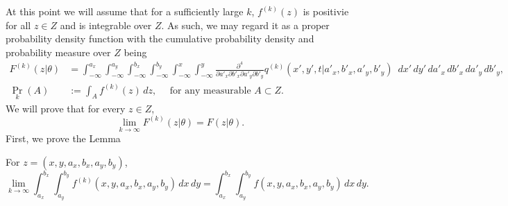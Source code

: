 At this point we will assume that for a sufficiently large $k$,
$f^{(k)}(z)$ is positivie for all $z \in Z$ and is integrable over
$Z$. As such, we may regard it as a proper probability density
function with the cumulative probability density and probability
measure over $Z$ being 
\begin{align}
  F^{(k)}(z | \theta) &= \displaystyle \int_{-\infty}^{a_x} \displaystyle \int_{-\infty}^{a_y} \displaystyle \int_{-\infty}^{b_x} \displaystyle \int_{-\infty}^{b_y} \displaystyle \int_{-\infty}^x \displaystyle \int_{-\infty}^y \frac{\partial^4}{\partial a'_x \partial b'_x \partial a'_y \partial b'_y} q^{(k)}(x', y', t | a'_x, b'_x, a'_y, b'_y)\,\,\, dx'\, dy'\, da'_x\, db'_x\, da'_y\, db'_y, \label{eq:approx-measure} \\
                          \Pr_{k}(A) &:= \displaystyle \int_{A} f^{(k)}(z)\, dz, \quad \mbox{ for any measurable } A \subset Z. \label{eq:approx-measure-2}
\end{align}
We will prove that for every $z \in Z$,
\[
  \lim_{k\to \infty} F^{(k)}(z | \theta) = F(z | \theta).
\]
First, we prove the Lemma
\begin{lemma}\label{lem:1}
  For $z = (x, y, a_x, b_x, a_y, b_y)$,
  \[
    \lim_{k\to \infty} \displaystyle \int_{a_x}^{b_x} \displaystyle
    \int_{a_y}^{b_y} f^{(k)}(x,y,a_x,b_x,a_y,b_y)\, dx\,dy =
    \displaystyle \int_{a_x}^{b_x} \displaystyle \int_{a_y}^{b_y}
    f(x,y,a_x,b_x,a_y,b_y)\, dx\,dy.
  \]
\end{lemma}
